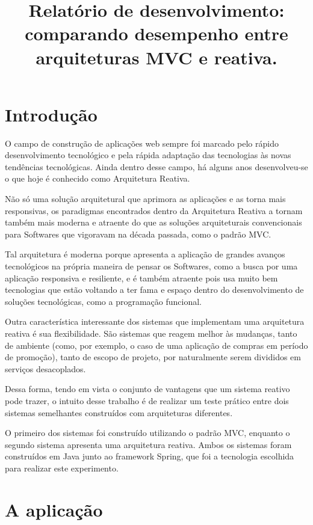 \documentclass[12pt, openright, oneside, a4paper, article,
  section=TITLE
]{abntex2}
\title{Relatório de desenvolvimento: comparando desempenho entre arquiteturas MVC e reativa.}
\begin{document}
\begin{center}
  \imprimirinstituicao 

  \imprimirautor 

  \imprimirtitulo
\end{center}

\textual

\section{Introdução}

O campo de construção de aplicações web sempre foi marcado pelo rápido desenvolvimento tecnológico e pela rápida adaptação das tecnologias às novas tendências tecnológicas. Ainda dentro desse campo, há alguns anos desenvolveu-se o que hoje é conhecido como Arquitetura Reativa. 

Não só uma solução arquitetural que aprimora as aplicações e as torna mais responsivas, os paradigmas encontrados dentro da Arquitetura Reativa a tornam também mais moderna e atraente do que as soluções arquiteturais convencionais para Softwares que vigoravam na década passada, como o padrão MVC. 

Tal arquitetura é moderna porque apresenta a aplicação de grandes avanços tecnológicos na própria maneira de pensar os Softwares, como a busca por uma aplicação responsiva e resiliente, e é também atraente pois usa muito bem tecnologias que estão voltando a ter fama e espaço dentro do desenvolvimento de soluções tecnológicas, como a programação funcional. 

Outra característica interessante dos sistemas que implementam uma arquitetura reativa é sua flexibilidade. São sistemas que reagem melhor às mudanças, tanto de ambiente (como, por exemplo, o caso de uma aplicação de compras em período de promoção), tanto de escopo de projeto, por naturalmente serem divididos em serviços desacoplados. 

Dessa forma, tendo em vista o conjunto de vantagens que um sistema reativo pode trazer, o intuito desse trabalho é de realizar um teste prático entre dois sistemas semelhantes construídos com arquiteturas diferentes. 

O primeiro dos sistemas foi construído utilizando o padrão MVC, enquanto o segundo sistema apresenta uma arquitetura reativa. Ambos os sistemas foram construídos em Java junto ao framework Spring, que foi a tecnologia escolhida para realizar este experimento.

\section{A aplicação}
\end{document}
